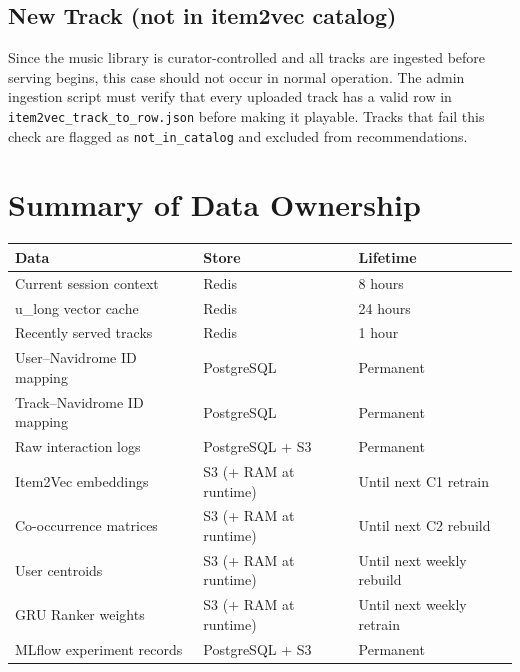 \documentclass[11pt]{article}
\begin{document}
\subsection{New Track (not in item2vec catalog)}

Since the music library is curator-controlled and all tracks are ingested before
serving begins, this case should not occur in normal operation.  The admin
ingestion script must verify that every uploaded track has a valid row in
\texttt{item2vec\_track\_to\_row.json} before making it playable.  Tracks that fail
this check are flagged as \texttt{not\_in\_catalog} and excluded from recommendations.

\section{Summary of Data Ownership}

\begin{longtable}{@{}lll@{}}
\toprule
Data & Store & Lifetime \\
\midrule
Current session context & Redis & 8 hours \\
u\_long vector cache & Redis & 24 hours \\
Recently served tracks & Redis & 1 hour \\
\midrule
User--Navidrome ID mapping & PostgreSQL & Permanent \\
Track--Navidrome ID mapping & PostgreSQL & Permanent \\
Raw interaction logs & PostgreSQL + S3 & Permanent \\
\midrule
Item2Vec embeddings & S3 (+ RAM at runtime) & Until next C1 retrain \\
Co-occurrence matrices & S3 (+ RAM at runtime) & Until next C2 rebuild \\
User centroids & S3 (+ RAM at runtime) & Until next weekly rebuild \\
GRU Ranker weights & S3 (+ RAM at runtime) & Until next weekly retrain \\
MLflow experiment records & PostgreSQL + S3 & Permanent \\
\bottomrule
\end{longtable}
\end{document}
